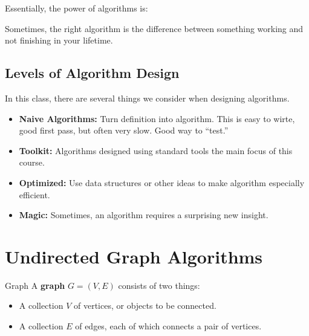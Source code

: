 \documentclass[letterpaper]{article}
\begin{document}
\bigskip 

Essentially, the power of algorithms is: 
\begin{mdframed}
    Sometimes, the right algorithm is the difference between something working and not finishing in your lifetime. 
\end{mdframed}

\subsection{Levels of Algorithm Design}
In this class, there are several things we consider when designing algorithms. 
\begin{itemize}
    \item \textbf{Naive Algorithms:} Turn definition into algorithm. This is easy to wirte, good first pass, but often very slow. Good way to ``test.''
    \item \textbf{Toolkit:} Algorithms designed using standard tools the main focus of this course. 
    \item \textbf{Optimized:} Use data structures or other ideas to make algorithm especially efficient. 
    \item \textbf{Magic:} Sometimes, an algorithm requires a surprising new insight. 
\end{itemize}




















\newpage 
\section{Undirected Graph Algorithms}
\begin{definition}{Graph}{}
    A \textbf{graph} $G = (V, E)$ consists of two things:
    \begin{itemize}
        \item A collection $V$ of vertices, or objects to be connected.
        \item A collection $E$ of edges, each of which connects a pair of vertices.
    \end{itemize}
\end{definition}
\end{document}
